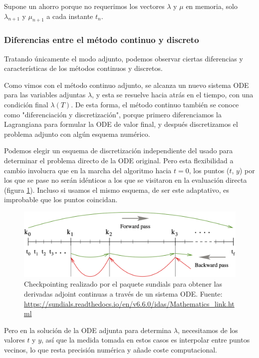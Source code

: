 Supone un ahorro porque no requerimos los vectores $\lambda$ y $\mu$ en
memoria, solo $\lambda_{n+1}$ y $\mu_{n+1}$ a cada instante $t_n$.


\subsubsection{Diferencias entre el método continuo y discreto}

Tratando únicamente el modo adjunto, podemos observar ciertas diferencias y
características de los métodos continuos y discretos.

Como vimos con el método continuo adjunto, se alcanza un nuevo sistema ODE para
las variables adjuntas $\lambda$, y esta se resuelve hacia atrás en el tiempo,
con una condición final $\lambda(T)$. De esta forma, el método continuo también
se conoce como "diferenciación y discretización", porque primero diferenciamos
la Lagrangiana para formular la ODE de valor final, y después discretizamos el
problema adjunto con algún esquema numérico.

Podemos elegir un esquema de discretización independiente del usado para
determinar el problema directo de la ODE original. Pero esta flexibilidad a
cambio involucra que en la marcha del algoritmo hacia $t = 0$, los puntos ($t$,
$y$) por los que se pase no serán idénticos a los que se visitaron en la
evaluación directa (figura \ref{fig:ode_adjoint_checkpointing_sundials}).
Incluso si usamos el mismo esquema, de ser este adaptativo, es improbable que
los puntos coincidan.

\begin{figure}[h]
	\centering
	\includegraphics[width=1\textwidth]{./capitulos/metodologia/images/ode_adjoint_checkpointing_sundials.png}
	\caption{Checkpointing realizado por el paquete sundials para obtener las
		derivadas adjoint continuas a través de un sistema ODE. Fuente:
		\url{https://sundials.readthedocs.io/en/v6.6.0/idas/Mathematics_link.html}}
	\label{fig:ode_adjoint_checkpointing_sundials}
\end{figure}

Pero en la solución de la ODE adjunta para determina $\lambda$, necesitamos de
los valores $t$ y $y$, así que la medida tomada en estos casos es interpolar
entre puntos vecinos, lo que resta precisión numérica y añade coste
computacional.

